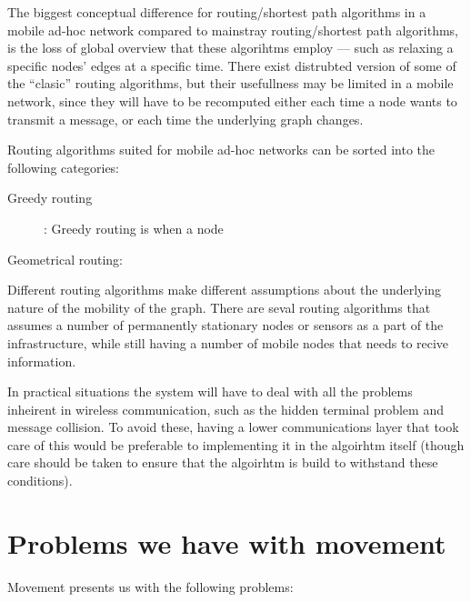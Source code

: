 \documentclass[letter, 12pt, english, draft]{article}
\begin{document}
The biggest conceptual difference for routing/shortest path algorithms in a mobile ad-hoc network compared to mainstray routing/shortest path algorithms, is the loss of global overview that these algorihtms employ --- such as relaxing a specific nodes' edges at a specific time. There exist distrubted version of some of the ``clasic'' routing algorithms, but their usefullness may be limited in a mobile network, since they will have to be recomputed either each time a node wants to transmit a message, or each time the underlying graph changes.

Routing algorithms suited for mobile ad-hoc networks can be sorted into the following categories:
\begin{description}
\item[Greedy routing]: Greedy routing is when a node 
\item[Geometrical routing:] 
\item[]
\end{description}

Different routing algorithms make different assumptions about the underlying nature of the mobility of the graph. There are seval routing algorithms \cite{two-tier}\cite{adaptive} that assumes a number of permanently stationary nodes or sensors as a part of the infrastructure, while still having a number of mobile nodes that needs to recive information. 

In practical situations the system will have to deal with all the problems inheirent in wireless communication, such as the hidden terminal problem and message collision. To avoid these, having a lower communications layer that took care of this would be preferable to implementing it in the algoirhtm itself (though care should be taken to ensure that the algoirhtm is build to withstand these conditions). 

\section{Problems we have with movement}

Movement presents us with the following problems:
\end{document}
